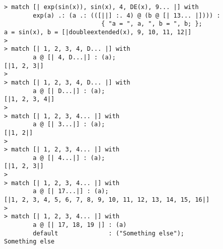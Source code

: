 \begin{center}\begin{minipage}{15cm}\begin{Verbatim}[frame=single]
> match [| exp(sin(x)), sin(x), 4, DE(x), 9... |] with
        exp(a) .: (a .: (([||] :. 4) @ (b @ [| 13... |]))) : 
                           { "a = ", a, ", b = ", b; };
a = sin(x), b = [|doubleextended(x), 9, 10, 11, 12|]
> 
> match [| 1, 2, 3, 4, D... |] with 
        a @ [| 4, D...|] : (a);
[|1, 2, 3|]
> 
> match [| 1, 2, 3, 4, D... |] with 
        a @ [| D...|] : (a);
[|1, 2, 3, 4|]
> 
> match [| 1, 2, 3, 4... |] with 
        a @ [| 3...|] : (a);
[|1, 2|]
> 
> match [| 1, 2, 3, 4... |] with 
        a @ [| 4...|] : (a);
[|1, 2, 3|]
> 
> match [| 1, 2, 3, 4... |] with 
        a @ [| 17...|] : (a);
[|1, 2, 3, 4, 5, 6, 7, 8, 9, 10, 11, 12, 13, 14, 15, 16|]
> 
> match [| 1, 2, 3, 4... |] with 
        a @ [| 17, 18, 19 |] : (a)
        default              : ("Something else");
Something else
\end{Verbatim}
\end{minipage}\end{center}
